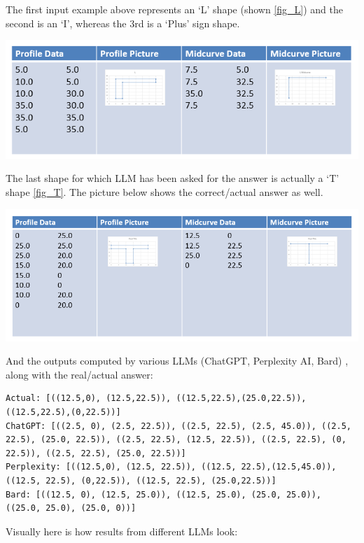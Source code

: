 \documentclass[conference]{IEEEtran}
\begin{document}
The first input example above represents an ‘L’ shape (shown \ref{fig_L}) and the second is an ‘I’, whereas the 3rd is a ‘Plus’ sign shape.

         \begin{center}
	\includegraphics[width=0.8\linewidth]{images/L}
	\label{fig_L}
    \end{center}
    
    
The last shape for which LLM has been asked for the answer is actually a ‘T’ shape \ref{fig_T}. The picture below shows the correct/actual answer as well.

         \begin{center}
	\includegraphics[width=0.8\linewidth]{images/T}
	\label{fig_T}
    \end{center}
    
And the outputs computed by various LLMs (ChatGPT, Perplexity AI, Bard) , along with the real/actual answer:

\begin{lstlisting}[basicstyle=\tiny, breaklines=true, breakatwhitespace=true, label=lst:python]
Actual: [((12.5,0), (12.5,22.5)), ((12.5,22.5),(25.0,22.5)), ((12.5,22.5),(0,22.5))]
ChatGPT: [((2.5, 0), (2.5, 22.5)), ((2.5, 22.5), (2.5, 45.0)), ((2.5, 22.5), (25.0, 22.5)), ((2.5, 22.5), (12.5, 22.5)), ((2.5, 22.5), (0, 22.5)), ((2.5, 22.5), (25.0, 22.5))]
Perplexity: [((12.5,0), (12.5, 22.5)), ((12.5, 22.5),(12.5,45.0)), ((12.5, 22.5), (0,22.5)), ((12.5, 22.5), (25.0,22.5))]
Bard: [((12.5, 0), (12.5, 25.0)), ((12.5, 25.0), (25.0, 25.0)), ((25.0, 25.0), (25.0, 0))]
\end{lstlisting}

Visually here is how results from different LLMs look:
\end{document}
